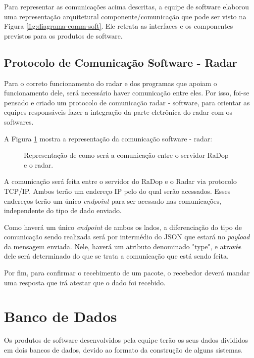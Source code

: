 Para representar as comunicações acima descritas, a equipe de software elaborou uma representação arquitetural componente/comunicação que pode ser visto na Figura \ref{fig:diagrama-comm-soft}. Ele retrata as interfaces e os componentes previstos para os produtos de software.

\subsection{Protocolo de Comunicação Software - Radar}

Para o correto funcionamento do radar e dos programas que apoiam o funcionamento dele, será necessário haver comunicação entre eles. Por isso, foi-se pensado e criado um protocolo de comunicação radar - software, para orientar as equipes responsáveis fazer a integração da parte eletrônica do radar com os softwares.

A Figura \ref{fig:diagrama-com-soft-radar} mostra a representação da comunicação software - radar:

\begin{figure}[H]
	\caption{\label{fig:diagrama-com-soft-radar} Representação de como será a comunicação entre o servidor RaDop e o radar.}
\end{figure}

A comunicação será feita entre o servidor do RaDop e o Radar via protocolo TCP/IP. Ambos terão um endereço IP pelo do qual serão acessados. Esses endereços terão um único \textit{endpoint} para ser acessado nas comunicações, independente do tipo de dado enviado.

Como haverá um único \textit{endpoint} de ambos os lados, a diferenciação do tipo de comunicação sendo realizada será por intermédio do JSON que estará no \textit{payload} da mensagem enviada. Nele, haverá um atributo denominado "type", e através dele será determinado do que se trata a comunicação que está sendo feita.

Por fim, para confirmar o recebimento de um pacote, o recebedor deverá mandar uma resposta que irá atestar que o dado foi recebido.

\section{Banco de Dados}

Os produtos de software desenvolvidos pela equipe terão os seus dados divididos em dois bancos de dados, devido ao formato da construção de alguns sistemas.


